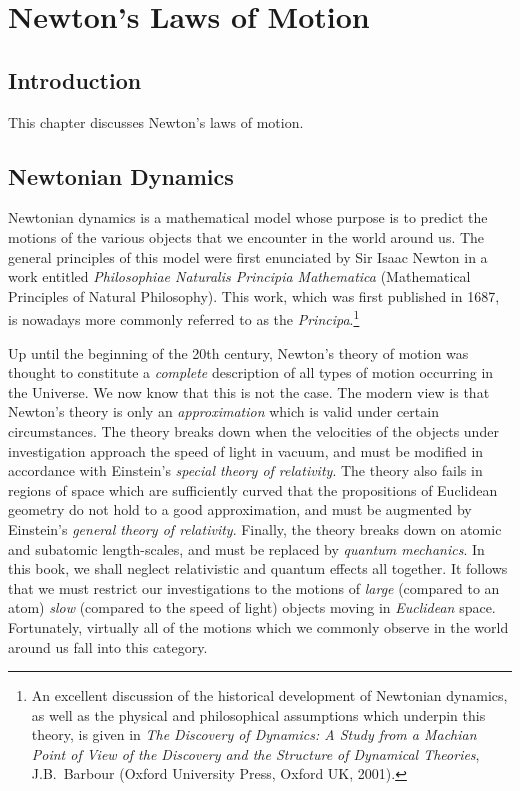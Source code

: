 \chapter{Newton's Laws of Motion}\label{sfun}
\section{Introduction}
This chapter discusses Newton's laws of motion.

\section{Newtonian Dynamics}
Newtonian dynamics is a mathematical model whose purpose is to 
predict  the motions of the various objects that we encounter in the world
around us. The general principles of this model were first enunciated
by Sir Isaac Newton in a work entitled {\em Philosophiae Naturalis Principia
Mathematica}\/ (Mathematical Principles of Natural Philosophy).  This work,
which was first published in 1687,  is nowadays more commonly referred to as the {\em Principa}.\footnote{An excellent discussion of the historical
development of Newtonian dynamics, as well as the physical and
philosophical assumptions which underpin this theory, is
given in {\em The Discovery of Dynamics: A Study from a Machian Point of View of the Discovery and the Structure of Dynamical Theories}, J.B.~Barbour (Oxford University Press, Oxford UK, 2001).}

Up until the beginning of the 20th century, Newton's theory of motion 
was thought to constitute a {\em complete}\/ description of all types of
motion occurring in the Universe. We now know that this is not the
case. The modern view is that Newton's theory is only an {\em approximation}\/ which is valid under certain circumstances. 
The theory breaks down when the velocities of the objects under
investigation approach the speed of light in vacuum, and must be modified in accordance with  Einstein's
{\em special theory of  relativity}. The theory also fails in regions of space which are sufficiently curved that the propositions of Euclidean geometry
do not hold to a good approximation, and must be augmented by Einstein's {\em general theory
of relativity}.
Finally, the theory breaks down on  atomic and subatomic length-scales, and must be replaced by {\em quantum mechanics}. 
In this book, we shall  neglect  relativistic and quantum effects all together.
It follows that  we must restrict our investigations to the motions  of {\em large}\/ (compared to an atom) {\em slow}\/ (compared to the speed of light) 
objects moving in {\em Euclidean}\/ space. Fortunately, virtually all of the motions which we commonly observe in the world around us fall into
this category. 

